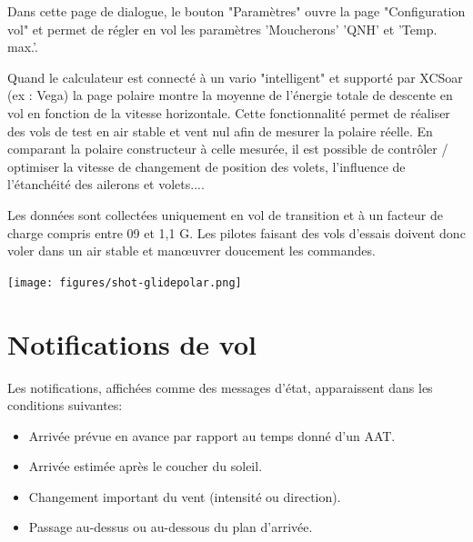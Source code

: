 Dans cette page de dialogue, le bouton "Paramètres" ouvre la page "Configuration vol" et permet de régler en vol les paramètres 'Moucherons' 'QNH' et 'Temp. max.'.

Quand le calculateur est connecté à un vario "intelligent" et supporté par XCSoar (ex : Vega) la page polaire montre la moyenne de l'énergie totale de descente en vol en fonction de la vitesse horizontale. Cette fonctionnalité permet de réaliser des vols de test en air stable et vent nul afin de mesurer la polaire réelle. En comparant la polaire constructeur à celle mesurée, il est possible de contrôler / optimiser la vitesse de changement de position des volets, l'influence de l'étanchéité des ailerons et volets....

Les données sont collectées uniquement en vol de transition et à un facteur de charge compris entre 09 et 1,1 G. Les pilotes faisant des vols d'essais doivent donc voler dans un air stable et manœuvrer doucement les commandes.
\begin{center}
\texttt{[image: figures/shot-glidepolar.png]}
\end{center}

\section{Notifications de vol}

Les notifications, affichées comme des messages d'état, apparaissent dans les conditions suivantes:
\begin{itemize}
\item Arrivée prévue en avance par rapport au temps donné d'un AAT.
\item Arrivée estimée après le coucher du soleil.
\item Changement important du vent (intensité ou direction).
\item Passage au-dessus ou au-dessous du plan d'arrivée.
\end{itemize}

